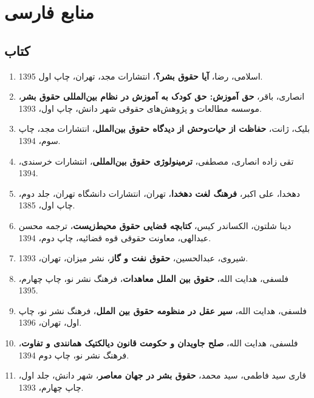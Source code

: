 

\section*{منابع فارسی}

		\subsection*{کتاب}
				\begin{enumerate}
	
	

\item 	اسلامی، رضا، \textbf{آیا حقوق بشر؟}، انتشارات مجد، تهران، چاپ اول 1395.
	
\item	انصاری، باقر، \textbf{حق آموزش: حق کودک به آموزش در نظام بین‌المللی حقوق بشر}، موسسه مطالعات و پژوهش‌های حقوقی شهر دانش، چاپ اول، 1393.

\item بلیک، ژانت، \textbf{حفاظت از حیات‌وحش از دیدگاه حقوق بین‌الملل}، انتشارات مجد، چاپ سوم، 1394.

\item 	تقی زاده انصاری، مصطفی، \textbf{ترمینولوژی حقوق بین‌المللی}، انتشارات خرسندی، 1394.

\item 	دهخدا، علی اکبر، \textbf{فرهنگ لغت دهخدا}، تهران، انتشارات دانشگاه تهران، جلد دوم، چاپ اول، 1385.
\item 	دینا شلتون، الکساندر کیس، \textbf{کتابچه قضایی حقوق محیط‌زیست}، ترجمه محسن عبدالهی، معاونت حقوقی قوه قضائیه، چاپ دوم، 1394.

\item 	شیروی، عبدالحسین، \textbf{حقوق نفت و گاز}، نشر میزان، تهران، 1393.

\item 	فلسفی، هدایت الله، \textbf{حقوق بین الملل معاهدات}، فرهنگ نشر نو، چاپ چهارم، 1395.

\item 	فلسفی، هدایت الله، \textbf{سیر عقل در منظومه حقوق بین الملل}، فرهنگ نشر نو، چاپ اول، تهران، 1396.

\item 	فلسفی، هدایت الله، \textbf{صلح جاویدان و حکومت قانون دیالکتیک همانندی و تفاوت}، فرهنگ نشر نو، چاپ دوم 1394.

\item 	قاری سید فاطمی، سید محمد، \textbf{حقوق بشر در جهان معاصر}، شهر دانش، جلد اول، چاپ چهارم، 1393.


\end{enumerate}
